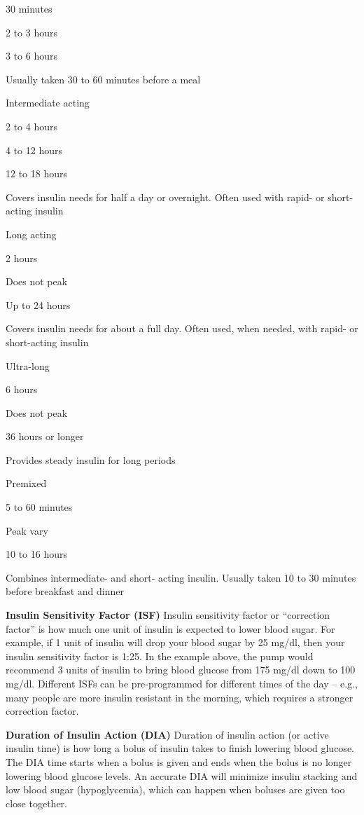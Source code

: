 \documentclass[
]{ctexart}
\begin{document}
30 minutes

2 to 3 hours

3 to 6 hours

Usually taken 30 to 60 minutes before a meal

Intermediate acting

2 to 4 hours

4 to 12 hours

12 to 18 hours

Covers insulin needs for half a day or overnight. Often used with rapid-
or short-acting insulin

Long acting

2 hours

Does not peak

Up to 24 hours

Covers insulin needs for about a full day. Often used, when needed, with
rapid- or short-acting insulin

Ultra-long

6 hours

Does not peak

36 hours or longer

Provides steady insulin for long periods

Premixed

5 to 60 minutes

Peak vary

10 to 16 hours

Combines intermediate- and short- acting insulin. Usually taken 10 to 30
minutes before breakfast and dinner

\textbf{Insulin Sensitivity Factor (ISF)} Insulin sensitivity factor or
``correction factor'' is how much one unit of insulin is expected to
lower blood sugar. For example, if 1 unit of insulin will drop your
blood sugar by 25 mg/dl, then your insulin sensitivity factor is 1:25.
In the example above, the pump would recommend 3 units of insulin to
bring blood glucose from 175 mg/dl down to 100 mg/dl. Different ISFs can
be pre-programmed for different times of the day -- e.g., many people
are more insulin resistant in the morning, which requires a stronger
correction factor.

\textbf{Duration of Insulin Action (DIA)} Duration of insulin action (or
active insulin time) is how long a bolus of insulin takes to finish
lowering blood glucose. The DIA time starts when a bolus is given and
ends when the bolus is no longer lowering blood glucose levels. An
accurate DIA will minimize insulin stacking and low blood sugar
(hypoglycemia), which can happen when boluses are given too close
together.
\end{document}
